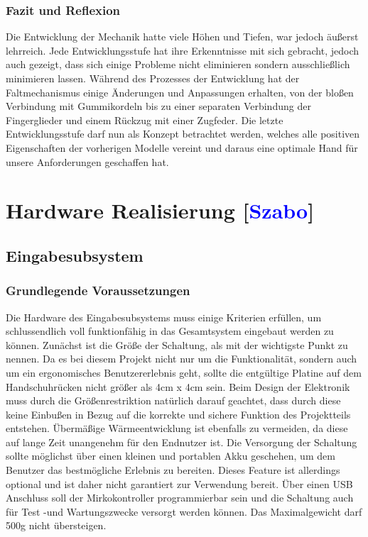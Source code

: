\documentclass[titlepage,12pt,twoside]{article}
\begin{document}
\subsubsection{Fazit und Reflexion}
Die Entwicklung der Mechanik hatte viele Höhen und Tiefen, war jedoch äußerst 
lehrreich. Jede Entwicklungsstufe hat ihre Erkenntnisse mit sich gebracht, jedoch 
auch gezeigt, dass sich einige Probleme nicht eliminieren sondern ausschließlich 
minimieren lassen. Während des Prozesses der Entwicklung hat der Faltmechanismus 
einige Änderungen und Anpassungen erhalten, von der bloßen Verbindung mit 
Gummikordeln bis zu einer separaten Verbindung der Fingerglieder und einem 
Rückzug mit einer Zugfeder. Die letzte Entwicklungsstufe darf nun als Konzept 
betrachtet werden, welches alle positiven Eigenschaften der vorherigen Modelle 
vereint und daraus eine optimale Hand für unsere Anforderungen geschaffen hat. \\

\newpage
\section{Hardware Realisierung  [\textcolor{blue}{Szabo}]}

\subsection{Eingabesubsystem}

\subsubsection{Grundlegende Voraussetzungen}
Die Hardware des Eingabesubsystems muss einige Kriterien erfüllen, um schlussendlich voll funktionfähig in das Gesamtsystem eingebaut 
werden zu können. Zunächst ist die Größe der Schaltung, als mit der wichtigste Punkt zu nennen. Da es bei diesem Projekt nicht nur
um die Funktionalität, sondern auch um ein ergonomisches Benutzererlebnis geht, sollte die entgültige Platine auf dem Handschuhrücken
nicht größer als 4cm x 4cm sein. Beim Design der Elektronik muss durch die Größenrestriktion natürlich darauf geachtet, dass durch
diese keine Einbußen in Bezug auf die korrekte und sichere Funktion des Projektteils entstehen. Übermäßige Wärmeentwicklung ist 
ebenfalls zu vermeiden, da diese auf lange Zeit unangenehm für den Endnutzer ist. Die Versorgung der Schaltung
sollte möglichst über einen kleinen und portablen Akku geschehen, um dem Benutzer das bestmögliche Erlebnis zu bereiten. Dieses Feature ist
allerdings optional und ist daher nicht garantiert zur Verwendung bereit. Über einen USB Anschluss soll der Mirkokontroller programmierbar sein und die Schaltung
auch für Test -und Wartungszwecke versorgt werden können. Das Maximalgewicht darf 500g nicht übersteigen. \\
\end{document}

